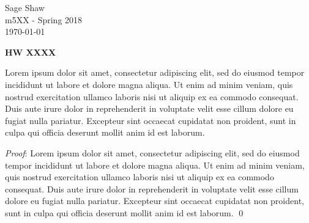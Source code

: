 \documentclass[12pt]{article}
\renewenvironment{proof}{\hspace{-4 ex} \emph{Proof}:}{\qed}
\begin{document}
	\thispagestyle{empty}
	
	\begin{flushright}
		Sage Shaw \\
		m5XX - Spring 2018 \\
		\today
	\end{flushright}
	
{\large \textbf{HW XXXX}}\bigbreak

Lorem ipsum dolor sit amet, consectetur adipiscing elit, sed do eiusmod tempor incididunt ut labore et dolore magna aliqua. Ut enim ad minim veniam, quis nostrud exercitation ullamco laboris nisi ut aliquip ex ea commodo consequat. Duis aute irure dolor in reprehenderit in voluptate velit esse cillum dolore eu fugiat nulla pariatur. Excepteur sint occaecat cupidatat non proident, sunt in culpa qui officia deserunt mollit anim id est laborum.

\begin{proof}
	Lorem ipsum dolor sit amet, consectetur adipiscing elit, sed do eiusmod tempor incididunt ut labore et dolore magna aliqua. Ut enim ad minim veniam, quis nostrud exercitation ullamco laboris nisi ut aliquip ex ea commodo consequat. Duis aute irure dolor in reprehenderit in voluptate velit esse cillum dolore eu fugiat nulla pariatur. Excepteur sint occaecat cupidatat non proident, sunt in culpa qui officia deserunt mollit anim id est laborum.
\end{proof}
\end{document}
